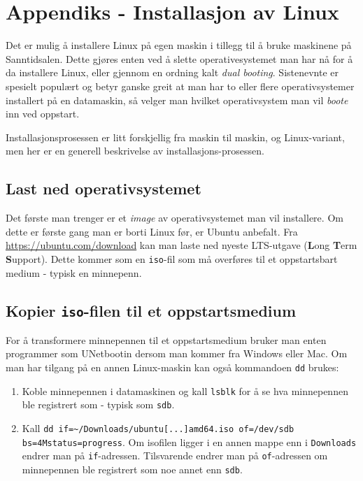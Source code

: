 
\appendix

\section{Appendiks - Installasjon av Linux}\label{4-appendix}

Det er mulig å installere Linux på egen maskin i tillegg til å bruke maskinene på Sanntidsalen. Dette gjøres enten ved å slette operativesystemet man har nå for å da installere Linux, eller gjennom en ordning kalt \textit{dual booting}. Sistenevnte er spesielt populært og betyr ganske greit at man har to eller flere operativsystemer installert på en datamaskin, så velger man hvilket operativsystem man vil \textit{boote} inn ved oppstart.

Installasjonsprosessen er litt forskjellig fra maskin til maskin, og Linux-variant, men her er en generell beskrivelse av installasjons-prosessen.

\subsection{Last ned operativsystemet}\label{app:linux-last}

Det første man trenger er et \textit{image} av operativsystemet man vil installere. Om dette er første gang man er borti Linux før, er Ubuntu anbefalt. Fra \href{https://ubuntu.com/download}{https://ubuntu\newline.com/download} kan man laste ned nyeste LTS-utgave (\textbf{L}ong \textbf{T}erm \textbf{S}upport). Dette kommer som en \verb|iso|-fil som må overføres til et oppstartsbart medium - typisk en minnepenn.

\subsection{Kopier \texttt{iso}-filen til et oppstartsmedium}

For å transformere minnepennen til et oppstartsmedium bruker man enten programmer som UNetbootin dersom man kommer fra Windows eller Mac. Om man har tilgang på en annen Linux-maskin kan også kommandoen \verb|dd| brukes:

\begin{enumerate}
    \item Koble minnepennen i datamaskinen og kall \verb|lsblk| for å se hva minnepennen ble registrert som - typisk som \verb|sdb|.
    \item Kall \verb|dd if=~/Downloads/ubuntu[...]amd64.iso of=/dev/sdb bs=4M|\newline \verb|status=progress|. Om isofilen ligger i en annen mappe enn i \verb|Downloads| endrer man på \verb|if|-adressen. Tilsvarende endrer man på \verb|of|-adressen om minnepennen ble registrert som noe annet enn \verb|sdb|.
\end{enumerate}

